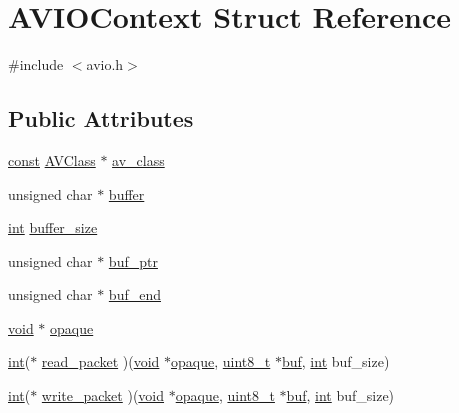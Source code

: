 \hypertarget{struct_a_v_i_o_context}{}\section{A\+V\+I\+O\+Context Struct Reference}
\label{struct_a_v_i_o_context}


{\ttfamily \#include $<$avio.\+h$>$}

\subsection*{Public Attributes}
\begin{DoxyCompactItemize}
\item 
\hyperlink{getopt1_8c_a2c212835823e3c54a8ab6d95c652660e}{const} \hyperlink{struct_a_v_class}{A\+V\+Class} $\ast$ \hyperlink{struct_a_v_i_o_context_a25d3b039ac00850a25d7b772566db6a8}{av\+\_\+class}
\item 
unsigned char $\ast$ \hyperlink{struct_a_v_i_o_context_a901e8fd2b978d40957c4ed0b77c2daf0}{buffer}
\item 
\hyperlink{xmltok_8h_a5a0d4a5641ce434f1d23533f2b2e6653}{int} \hyperlink{struct_a_v_i_o_context_a0204148f407d72becba822b90e8ce9a6}{buffer\+\_\+size}
\item 
unsigned char $\ast$ \hyperlink{struct_a_v_i_o_context_a3500915a7434270c42dffc80fafffa2d}{buf\+\_\+ptr}
\item 
unsigned char $\ast$ \hyperlink{struct_a_v_i_o_context_a0683d1a134b647c54f6d087d152c9a64}{buf\+\_\+end}
\item 
\hyperlink{sound_8c_ae35f5844602719cf66324f4de2a658b3}{void} $\ast$ \hyperlink{struct_a_v_i_o_context_afa97c079a10a48588f7b55f9dfff1e47}{opaque}
\item 
\hyperlink{xmltok_8h_a5a0d4a5641ce434f1d23533f2b2e6653}{int}($\ast$ \hyperlink{struct_a_v_i_o_context_a9be0423e0c66d11d8e0ace043e3aec08}{read\+\_\+packet} )(\hyperlink{sound_8c_ae35f5844602719cf66324f4de2a658b3}{void} $\ast$\hyperlink{struct_a_v_i_o_context_afa97c079a10a48588f7b55f9dfff1e47}{opaque}, \hyperlink{lib-src_2ffmpeg_2win32_2stdint_8h_a9a941819355e6f658991890ff66b4b0e}{uint8\+\_\+t} $\ast$\hyperlink{xlstr_8c_a781718f5b53a876fe91c424c4607fa8f}{buf}, \hyperlink{xmltok_8h_a5a0d4a5641ce434f1d23533f2b2e6653}{int} buf\+\_\+size)
\item 
\hyperlink{xmltok_8h_a5a0d4a5641ce434f1d23533f2b2e6653}{int}($\ast$ \hyperlink{struct_a_v_i_o_context_afb1f05f0e4e957090ccc23f0b82a0b08}{write\+\_\+packet} )(\hyperlink{sound_8c_ae35f5844602719cf66324f4de2a658b3}{void} $\ast$\hyperlink{struct_a_v_i_o_context_afa97c079a10a48588f7b55f9dfff1e47}{opaque}, \hyperlink{lib-src_2ffmpeg_2win32_2stdint_8h_a9a941819355e6f658991890ff66b4b0e}{uint8\+\_\+t} $\ast$\hyperlink{xlstr_8c_a781718f5b53a876fe91c424c4607fa8f}{buf}, \hyperlink{xmltok_8h_a5a0d4a5641ce434f1d23533f2b2e6653}{int} buf\+\_\+size)

\end{DoxyCompactItemize}
